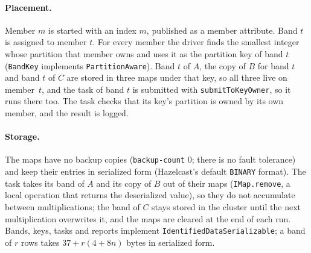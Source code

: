\documentclass[11pt,a4paper]{article}
\begin{document}
\paragraph{Placement.} Member $m$ is started with an index $m$, published as a
member attribute. Band $t$ is assigned to member $t$. For every member the
driver finds the smallest integer whose partition that member owns and uses it
as the partition key of band $t$ (\texttt{BandKey} implements
\texttt{PartitionAware}). Band $t$ of $A$, the copy of $B$ for band $t$ and band
$t$ of $C$ are stored in three maps under that key, so all three live on
member~$t$, and the task of band $t$ is submitted with
\texttt{submitToKeyOwner}, so it runs there too. The task checks that its key's
partition is owned by its own member, and the result is logged.

\paragraph{Storage.} The maps have no backup copies (\texttt{backup-count} 0;
there is no fault tolerance) and keep their entries in serialized form
(Hazelcast's default \texttt{BINARY} format). The task takes its band of $A$
and its copy of $B$ out of their maps (\texttt{IMap.remove}, a local operation
that returns the deserialized value), so they do not accumulate between
multiplications; the band of $C$ stays stored in the cluster until the next
multiplication overwrites it, and the maps are cleared at the end of each run.
Bands, keys, tasks and reports implement \texttt{IdentifiedDataSerializable};
a band of $r$ rows takes $37+r(4+8n)$ bytes in serialized form.
\end{document}

